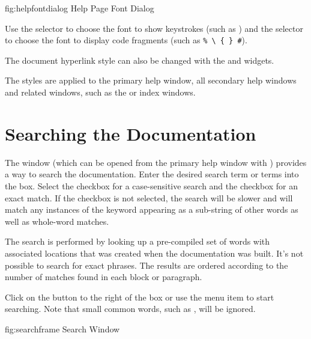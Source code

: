 \FloatFig
{fig:helpfontdialog}
{%
}
{Help Page Font Dialog}

Use the  selector to
choose the font to show keystrokes (such as
) and the
 selector to choose the
font to display code fragments (such as \verb|% \ { } #|).

The document hyperlink style can also be changed with the 
 and
 widgets.

The styles are applied to the primary help window, all secondary
help windows and related windows, such as the  
or index windows.

\section{Searching the Documentation}
\label{sec:helpsearch}

The  window (which can be opened from the
primary help window with ) provides 
a way to search the documentation. Enter the desired search term or terms into the
 box. Select the 
checkbox for a case-sensitive search and the 
checkbox for an exact match. If the 
checkbox is not selected, the search will be slower and will match
any instances of the keyword appearing as a sub-string of other
words as well as whole-word matches.

\begin{information}
The search is performed by looking up a pre-compiled set of words with
associated locations that was created when the documentation was
built. It's not possible to search for exact phrases. The results are
ordered according to the number of matches found in each block or
paragraph.
\end{information}

Click on the  button to the
right of the  box or use the 
menu item to start searching. Note that small common words, such as , will be
ignored.

\FloatFig
{fig:searchframe}
{%
}
{Search Window}

